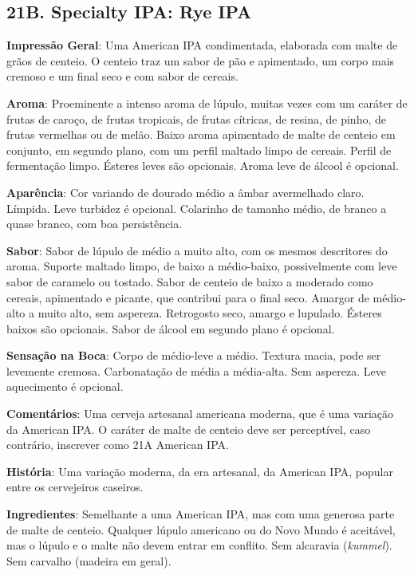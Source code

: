 \subsection*{21B. Specialty IPA: Rye IPA}
\textbf{Impressão Geral}: Uma American IPA condimentada, elaborada com malte de grãos de centeio. O centeio traz um sabor de pão e apimentado, um corpo mais cremoso e um final seco e com sabor de cereais.

\textbf{Aroma}: Proeminente a intenso aroma de lúpulo, muitas vezes com um caráter de frutas de caroço, de frutas tropicais, de frutas cítricas, de resina, de pinho, de frutas vermelhas ou de melão. Baixo aroma apimentado de malte de centeio em conjunto, em segundo plano, com um perfil maltado limpo de cereais. Perfil de fermentação limpo. Ésteres leves são opcionais. Aroma leve de álcool é opcional.

\textbf{Aparência}: Cor variando de dourado médio a âmbar avermelhado claro. Límpida. Leve turbidez é opcional. Colarinho de tamanho médio, de branco a quase branco, com boa persistência.

\textbf{Sabor}: Sabor de lúpulo de médio a muito alto, com os mesmos descritores do aroma. Suporte maltado limpo, de baixo a médio-baixo, possivelmente com leve sabor de caramelo ou tostado. Sabor de centeio de baixo a moderado como cereais, apimentado e picante, que contribui para o final seco. Amargor de médio-alto a muito alto, sem aspereza. Retrogosto seco, amargo e lupulado. Ésteres baixos são opcionais. Sabor de álcool em segundo plano é opcional.

\textbf{Sensação na Boca}: Corpo de médio-leve a médio. Textura macia, pode ser levemente cremosa. Carbonatação de média a média-alta. Sem aspereza. Leve aquecimento é opcional.

\textbf{Comentários}: Uma cerveja artesanal americana moderna, que é uma variação da American IPA. O caráter de malte de centeio deve ser perceptível, caso contrário, inscrever como 21A American IPA.

\textbf{História}: Uma variação moderna, da era artesanal, da American IPA, popular entre os cervejeiros caseiros.

\textbf{Ingredientes}: Semelhante a uma American IPA, mas com uma generosa parte de malte de centeio. Qualquer lúpulo americano ou do Novo Mundo é aceitável, mas o lúpulo e o malte não devem entrar em conflito. Sem alcaravia (\textit{kummel}). Sem carvalho (madeira em geral).

